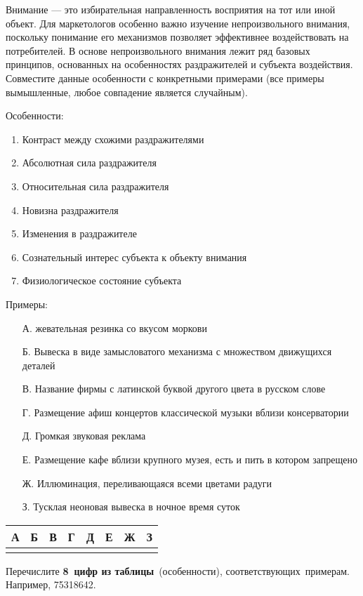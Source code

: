 
Внимание — это избирательная направленность восприятия на тот или иной объект. Для маркетологов особенно важно изучение непроизвольного внимания, поскольку понимание его механизмов позволяет эффективнее воздействовать на потребителей. В основе непроизвольного внимания лежит ряд базовых принципов, основанных на особенностях раздражителей и субъекта воздействия. Совместите данные особенности с конкретными примерами (все примеры вымышленные, любое совпадение является случайным).

Особенности:
\begin{enumerate}
    \item Контраст между схожими раздражителями
    \item Абсолютная сила раздражителя
    \item Относительная сила раздражителя
    \item Новизна раздражителя
    \item Изменения в раздражителе
    \item Сознательный интерес субъекта к объекту внимания
    \item Физиологическое состояние субъекта
\end{enumerate}

Примеры:
\begin{enumerate}
    \item[А.] жевательная резинка со вкусом моркови
    \item[Б.] Вывеска в виде замысловатого механизма с множеством движущихся деталей
    \item[В.] Название фирмы с латинской буквой другого цвета в русском слове
    \item[Г.] Размещение афиш концертов классической музыки вблизи консерватории
    \item[Д.] Громкая звуковая реклама
    \item[Е.] Размещение кафе вблизи крупного музея, есть и пить в котором запрещено
    \item[Ж.] Иллюминация, переливающаяся всеми цветами радуги
    \item[З.] Тусклая неоновая вывеска в ночное время суток
\end{enumerate}

\begin{tabular}{|p{1.5cm}|p{1.5cm}|p{1.5cm}|p{1.5cm}|p{1.5cm}|p{1.5cm}|p{1.5cm}|p{1.5cm}|}
    \hline
    А&Б&В&Г&Д&Е&Ж&З \\
    \hline
    &&&&&&&\\
    \hline
\end{tabular}

Перечислите \textbf{8 цифр из таблицы} (особенности), соответствующих примерам. Например, 75318642.

